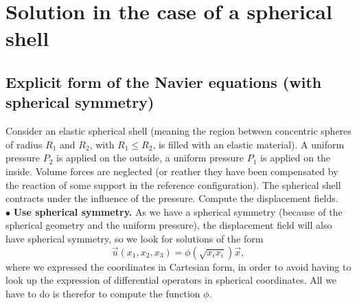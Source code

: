 \documentclass[DIV=12]{article}
\begin{document}
\section{Solution in the case of a spherical shell}
\subsection{Explicit form of the Navier equations (with spherical symmetry)}
Consider an elastic spherical shell (meaning the region  between concentric spheres of radius $R_1$ and $R_2$, with $R_1\leq R_2$, is filled with an
 elastic material). A uniform pressure $P_2$ is applied on the outside, a uniform pressure $P_1$ is applied 
 on the inside. Volume forces are neglected (or reather they have
 been compensated by the reaction of some support in the reference configuration). The 
 spherical shell contracts under the influence of the pressure. Compute the displacement fields.\\

$\bullet$ {\bf{Use spherical symmetry.}} As we have a spherical symmetry (because of the spherical geometry and the uniform pressure), 
 the displacement field will also have spherical symmetry, so we look for solutions of the form 
\begin{equation}
 \vec{u}( x_1,x_2, x_3 ) = \phi( \sqrt{x_i x_i} ) \vec{x},
\end{equation}
 where we expressed the coordinates in Cartesian form, in order to avoid having to look up 
 the expression of differential operators in spherical coordinates. All we have to do is therefor to compute the function $\phi$.\\
\end{document}

